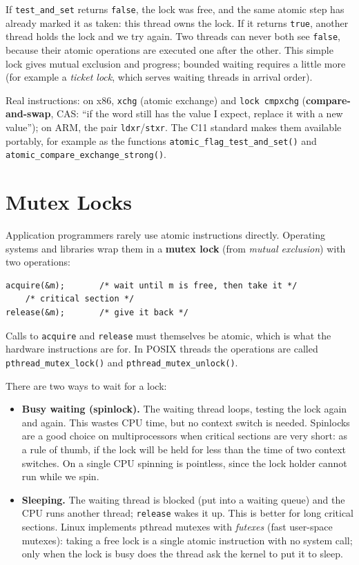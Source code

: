 \documentclass[11pt,a4paper]{article}
\newcommand{\term}[1]{\textbf{\color{mintdeep}#1}}
\newcommand{\cmd}[1]{\texttt{#1}}
\begin{document}
If \texttt{test\_and\_set} returns \texttt{false}, the lock was free, and the same atomic step has already marked it as taken: this thread owns the lock. If it returns \texttt{true}, another thread holds the lock and we try again. Two threads can never both see \texttt{false}, because their atomic operations are executed one after the other. This simple lock gives mutual exclusion and progress; bounded waiting requires a little more (for example a \emph{ticket lock}, which serves waiting threads in arrival order).

Real instructions: on x86, \texttt{xchg} (atomic exchange) and \texttt{lock cmpxchg} (\term{compare-and-swap}, CAS: ``if the word still has the value I expect, replace it with a new value''); on ARM, the pair \texttt{ldxr}/\texttt{stxr}. The C11 standard makes them available portably, for example as the functions \texttt{atomic\_flag\_test\_and\_set()} and \texttt{atomic\_compare\_exchange\_strong()}.

\section{Mutex Locks}

Application programmers rarely use atomic instructions directly. Operating systems and libraries wrap them in a \term{mutex lock} (from \emph{mutual exclusion}) with two operations:
\begin{lstlisting}
acquire(&m);       /* wait until m is free, then take it */
    /* critical section */
release(&m);       /* give it back */
\end{lstlisting}
Calls to \texttt{acquire} and \texttt{release} must themselves be atomic, which is what the hardware instructions are for. In POSIX threads the operations are called \cmd{pthread\_mutex\_lock()} and \cmd{pthread\_mutex\_unlock()}.

There are two ways to wait for a lock:
\begin{itemize}
  \item \textbf{Busy waiting (spinlock).} The waiting thread loops, testing the lock again and again. This wastes CPU time, but no context switch is needed. Spinlocks are a good choice on multiprocessors when critical sections are very short: as a rule of thumb, if the lock will be held for less than the time of two context switches. On a single CPU spinning is pointless, since the lock holder cannot run while we spin.
  \item \textbf{Sleeping.} The waiting thread is blocked (put into a waiting queue) and the CPU runs another thread; \texttt{release} wakes it up. This is better for long critical sections. Linux implements pthread mutexes with \emph{futexes} (fast user-space mutexes): taking a free lock is a single atomic instruction with no system call; only when the lock is busy does the thread ask the kernel to put it to sleep.
\end{itemize}
\end{document}
